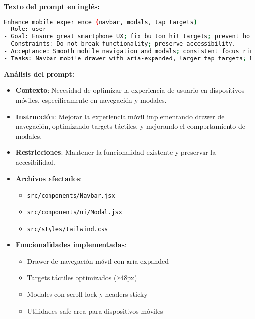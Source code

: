 \documentclass[12pt,a4paper]{article}
\begin{document}
\textbf{Texto del prompt en inglés:}
\begin{lstlisting}[language=bash]
Enhance mobile experience (navbar, modals, tap targets)
- Role: user
- Goal: Ensure great smartphone UX; fix button hit targets; prevent horizontal overflow; improve navbar and modal behavior.
- Constraints: Do not break functionality; preserve accessibility.
- Acceptance: Smooth mobile navigation and modals; consistent focus ring; no overflow.
- Tasks: Navbar mobile drawer with aria-expanded, larger tap targets; Modal with body scroll lock, sticky header, `max-h` and internal scroll; remove tap highlight; safe-area utilities.
\end{lstlisting}

\textbf{Análisis del prompt:}
\begin{itemize}
    \item \textbf{Contexto}: Necesidad de optimizar la experiencia de usuario en dispositivos móviles, específicamente en navegación y modales.
    
    \item \textbf{Instrucción}: Mejorar la experiencia móvil implementando drawer de navegación, optimizando targets táctiles, y mejorando el comportamiento de modales.
    
    \item \textbf{Restricciones}: Mantener la funcionalidad existente y preservar la accesibilidad.
    
    \item \textbf{Archivos afectados}:
    \begin{itemize}
        \item \texttt{src/components/Navbar.jsx}
        \item \texttt{src/components/ui/Modal.jsx}
        \item \texttt{src/styles/tailwind.css}
    \end{itemize}
    
    \item \textbf{Funcionalidades implementadas}:
    \begin{itemize}
        \item Drawer de navegación móvil con aria-expanded
        \item Targets táctiles optimizados (≥48px)
        \item Modales con scroll lock y headers sticky
        \item Utilidades safe-area para dispositivos móviles
    \end{itemize}
\end{itemize}
\end{document}
